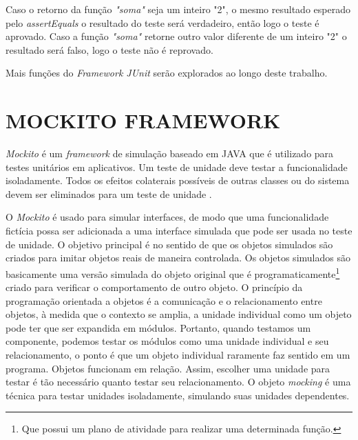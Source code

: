 Caso o retorno da função \textit{"soma"} seja um inteiro "2", o mesmo resultado esperado pelo \textit{assertEquals} o resultado do teste será verdadeiro, então logo o teste é aprovado. Caso a função \textit{"soma"} retorne outro valor diferente de um inteiro "2" o resultado será falso, logo o teste não é reprovado. 


    Mais funções do \textit{Framework JUnit} serão explorados ao longo deste trabalho.


\section{MOCKITO FRAMEWORK}


\textit{Mockito} é um \textit{framework} de simulação baseado em JAVA que é utilizado para testes unitários em aplicativos. Um teste de unidade deve testar a funcionalidade isoladamente. Todos os efeitos colaterais possíveis de outras classes ou do sistema devem ser eliminados para um teste de unidade  \cite{Mockito}. 


O \textit{Mockito} é usado para simular interfaces, de modo que uma funcionalidade fictícia possa ser adicionada a uma interface simulada que pode ser usada no teste de unidade. O objetivo principal é no sentido de que os objetos simulados são criados para imitar objetos reais de maneira controlada. Os objetos simulados são basicamente uma versão simulada do objeto original que é programaticamente\footnote{Que possui um plano de atividade para realizar uma determinada função.} criado para verificar o comportamento de outro objeto. O princípio da programação orientada a objetos é a comunicação e o relacionamento entre objetos, à medida que o contexto se amplia, a unidade individual como um objeto pode ter que ser expandida em módulos. Portanto, quando testamos um componente, podemos testar os módulos como uma unidade individual e seu relacionamento, o ponto é que um objeto individual raramente faz sentido em um programa. Objetos funcionam em relação. Assim, escolher uma unidade para testar é tão necessário quanto testar seu relacionamento. O objeto \textit{mocking} é uma técnica para testar unidades isoladamente, simulando suas unidades dependentes.




